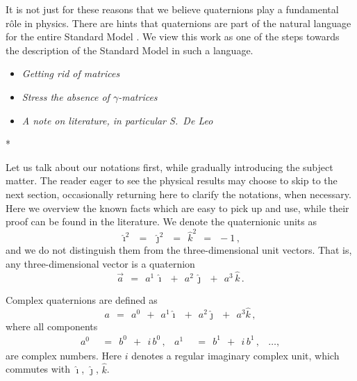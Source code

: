 \documentclass[epsfig,12pt]{article}
\newcommand{\ii}{\hat\imath}
\newcommand{\jj}{\hat\jmath}
\newcommand{\kk}{\hat k}
\begin{document}
	It is not just for these reasons that we believe quaternions play a fundamental r\^ole in physics.
	There are hints that quaternions are part of the natural language for the entire Standard Model \cite{}.
	We view this work as one of the steps towards the description of the Standard Model in
	such a language.

\begin{itemize}

\item	\emph{Getting rid of matrices}

\item   \emph{Stress the absence of  $ \gamma $-matrices}

\item	\emph{A note on literature, in particular S.~De Leo}

\end{itemize}


\vskip 0.8cm
\centerline{*\qquad\qquad\qquad*\qquad\qquad\qquad*}
\vskip 0.6cm


	Let us talk about our notations first, while gradually introducing the subject matter.
	The reader eager to see the physical results may choose to skip to the next section, occasionally returning here
	to clarify the notations, when necessary.
	Here we overview the known facts which are easy to pick up and use, while their proof can be found in the literature.
	We denote the quaternionic units as
\begin{equation}
	\ii^2	~~=~~	\jj^2	~~=~~	\kk^2	~~=~~	-1\,,
\end{equation}
	and we do not distinguish them from the three-dimensional unit vectors.
	That is, any three-dimensional vector is a quaternion
\begin{equation}
	\vec a	~~=~~	a^1\, \ii  ~~+~~  a^2\, \jj  ~~+~~  a^3\, \kk\,.
\end{equation}

	Complex quaternions are defined as
\begin{equation}
\label{cq}
	a	~~=~~	a^0  ~~+~~  a^1 \ii  ~~+~~  a^2 \jj  ~~+~~  a^3 \kk\,,
\end{equation}
	where all components
\begin{align}
	a^0	& ~~=~~	b^0  ~~+~~  i\,b^0\,,
	&
	a^1	& ~~=~~ b^1  ~~+~~  i\,b^1\,,
	&
	\dots,
\end{align}
	are complex numbers.
	Here $ i $ denotes a regular imaginary complex unit, which commutes with $ \ii $, $ \jj $, $ \kk $.
\end{document}
